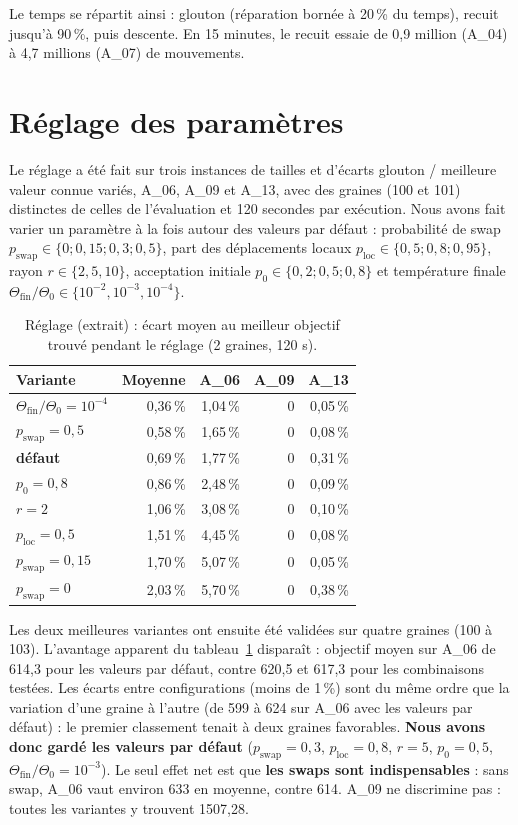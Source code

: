 \documentclass[11pt,a4paper]{report}
\begin{document}
Le temps se répartit ainsi : glouton (réparation bornée à 20\,\% du temps), recuit jusqu'à 90\,\%,
puis descente. En 15 minutes, le recuit essaie de 0,9 million (A\_04) à 4,7 millions (A\_07) de
mouvements.

\section{Réglage des paramètres}

Le réglage a été fait sur trois instances de tailles et d'écarts glouton / meilleure valeur connue
variés, A\_06, A\_09 et A\_13, avec des graines (100 et 101) distinctes de celles de l'évaluation et
120 secondes par exécution. Nous avons fait varier un paramètre à la fois autour des valeurs par
défaut : probabilité de swap $p_{\text{swap}} \in \{0; 0{,}15; 0{,}3; 0{,}5\}$, part des
déplacements locaux $p_{\text{loc}} \in \{0{,}5; 0{,}8; 0{,}95\}$, rayon $r \in \{2, 5, 10\}$,
acceptation initiale $p_0 \in \{0{,}2; 0{,}5; 0{,}8\}$ et température finale
$\Theta_{\text{fin}} / \Theta_0 \in \{10^{-2}, 10^{-3}, 10^{-4}\}$.

\begin{table}[H]
\centering
\small
\caption{Réglage (extrait) : écart moyen au meilleur objectif trouvé pendant le réglage (2 graines, 120 s).}
\label{tab:reglage}
\begin{tabular}{lrrrr}
\toprule
Variante & Moyenne & A\_06 & A\_09 & A\_13 \\
\midrule
$\Theta_{\text{fin}} / \Theta_0 = 10^{-4}$ & 0,36\,\% & 1,04\,\% & 0 & 0,05\,\% \\
$p_{\text{swap}} = 0{,}5$ & 0,58\,\% & 1,65\,\% & 0 & 0,08\,\% \\
\textbf{défaut} & 0,69\,\% & 1,77\,\% & 0 & 0,31\,\% \\
$p_0 = 0{,}8$ & 0,86\,\% & 2,48\,\% & 0 & 0,09\,\% \\
$r = 2$ & 1,06\,\% & 3,08\,\% & 0 & 0,10\,\% \\
$p_{\text{loc}} = 0{,}5$ & 1,51\,\% & 4,45\,\% & 0 & 0,08\,\% \\
$p_{\text{swap}} = 0{,}15$ & 1,70\,\% & 5,07\,\% & 0 & 0,05\,\% \\
$p_{\text{swap}} = 0$ & 2,03\,\% & 5,70\,\% & 0 & 0,38\,\% \\
\bottomrule
\end{tabular}
\end{table}

Les deux meilleures variantes ont ensuite été validées sur quatre graines (100 à 103). L'avantage
apparent du tableau~\ref{tab:reglage} disparaît : objectif moyen sur A\_06 de 614,3 pour les
valeurs par défaut, contre 620,5 et 617,3 pour les combinaisons testées. Les écarts entre
configurations (moins de 1\,\%) sont du même ordre que la variation d'une graine à l'autre (de 599 à
624 sur A\_06 avec les valeurs par défaut) : le premier classement tenait à deux graines
favorables. \textbf{Nous avons donc gardé les valeurs par défaut} ($p_{\text{swap}} = 0{,}3$,
$p_{\text{loc}} = 0{,}8$, $r = 5$, $p_0 = 0{,}5$, $\Theta_{\text{fin}} / \Theta_0 = 10^{-3}$). Le seul effet net
est que \textbf{les swaps sont indispensables} : sans swap, A\_06 vaut environ 633 en moyenne,
contre 614. A\_09 ne discrimine pas : toutes les variantes y trouvent 1507,28.
\end{document}
